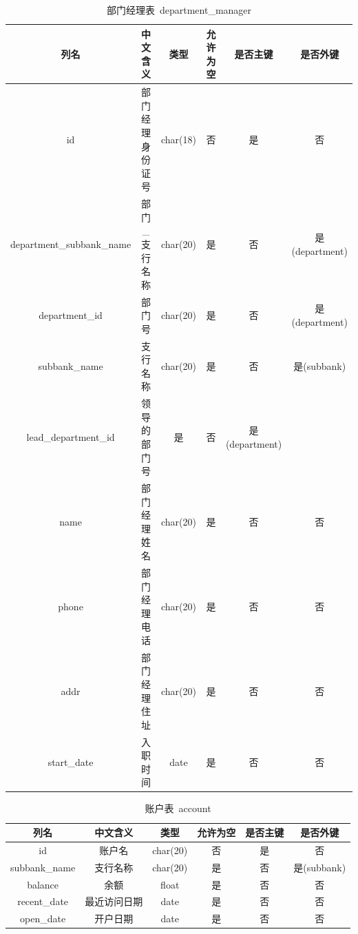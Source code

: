 \documentclass{article}
\begin{document}
    \begin{table}[H]
        \centering
        \caption{部门经理表\ department\_manager}
        \begin{tabular}{cccccc}
            \hline
            列名 & 中文含义 & 类型 & 允许为空 & 是否主键 & 是否外键 \\
            \hline
            id & 部门经理身份证号 & char(18) & 否 & 是 & 否 \\
            department\_subbank\_name & 部门\_支行名称 & char(20) & 是 & 否 & 是(department) \\
            department\_id & 部门号 & char(20) & 是 & 否 & 是(department) \\
            subbank\_name & 支行名称 & char(20) & 是 & 否 & 是(subbank) \\
            lead\_department\_id & 领导的部门号 & 是 & 否 & 是(department) \\
            name & 部门经理姓名 & char(20) & 是 & 否 & 否 \\
            phone & 部门经理电话 & char(20) & 是 & 否 & 否 \\
            addr & 部门经理住址 & char(20) & 是 & 否 & 否 \\
            start\_date & 入职时间 & date & 是 & 否 & 否 \\
            \hline
        \end{tabular}
    \end{table}
    \begin{table}[H]
        \centering
        \caption{账户表\ account}
        \begin{tabular}{cccccc}
            \hline
            列名 & 中文含义 & 类型 & 允许为空 & 是否主键 & 是否外键 \\
            \hline
            id & 账户名 & char(20) & 否 & 是 & 否 \\
            subbank\_name & 支行名称 & char(20) & 是 & 否 & 是(subbank) \\
            balance & 余额 & float & 是 & 否 & 否 \\
            recent\_date & 最近访问日期 & date & 是 & 否 & 否 \\
            open\_date & 开户日期 & date & 是 & 否 & 否 \\
            \hline
        \end{tabular}
    \end{table}
\end{document}
